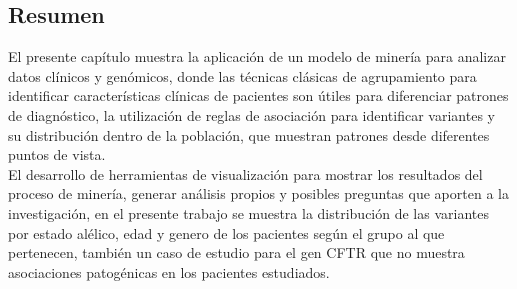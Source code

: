 \subsection*{Resumen}

El presente capítulo muestra la aplicación de un modelo de minería para analizar datos clínicos y genómicos, donde las técnicas clásicas de  agrupamiento para identificar características clínicas de pacientes son útiles para diferenciar patrones de diagnóstico, la utilización de reglas de asociación para identificar variantes y su distribución dentro de la población, que muestran patrones desde diferentes puntos de vista.\\

El desarrollo de herramientas de visualización para mostrar los resultados del proceso de minería, generar análisis propios y posibles preguntas que aporten a la investigación, en el presente  trabajo se muestra la distribución de las variantes por estado alélico, edad y genero de los pacientes según el grupo al que pertenecen, también un caso de estudio para el gen CFTR que no muestra asociaciones patogénicas en los pacientes estudiados.




   
